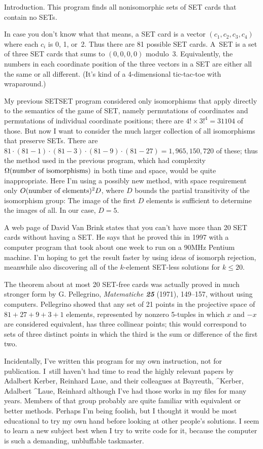 
\srcloctrue
\datethis
\def\SET/{{\mc SET\null}}


Introduction. This program finds all nonisomorphic sets
of \SET/ cards
that contain no \SET/s.

In case you don't know what that means, a \SET/ card is a vector
$(c_1,c_2,c_3,c_4)$ where each $c_i$ is 0, 1, or~2. Thus there are 81
possible \SET/ cards. A~\SET/ is a set of three \SET/ cards that sums
to $(0,0,0,0)$ modulo~3. Equivalently, the numbers in each coordinate
position of the three vectors in a \SET/ are either all the same or all
different. (It's kind of a 4-dimensional tic-tac-toe with wraparound.)

My previous {\sc SETSET} program considered only isomorphisms that
apply directly to the semantics of the game of \SET/, namely
permutations of coordinates and permutations of individual coordinate
positions; there are $4!\times 3!^4=31104$ of those. But now I want
to consider the much larger collection of all isomorphisms that
preserve \SET/s. There are $81\cdot(81-1)\cdot(81-3)\cdot(81-9)\cdot(81-27)
=1{,}965{,}150{,}720$ of these; thus the method used in the
previous program, which had complexity $\Omega(\hbox{number of isomorphisms})$
in both time and space, would be quite inappropriate. Here I'm using
a possibly new method, with space requirement only
$O(\hbox{number of elements})^2D$, where $D$ bounds the partial
transitivity of the isomorphism group: The image of the first $D$ elements
is sufficient to determine the images of all. In our case, $D=5$.

A web page of David Van Brink states that you can't have more than 20 \SET/
cards without having a \SET/. He says that he proved this in 1997 with a
computer program that took about one week to run on a 90MHz Pentium machine.
I'm hoping to get the result faster by using ideas of isomorph rejection,
meanwhile also discovering all of the $k$-element \SET/-less solutions
for $k\le20$.

The theorem about at most 20 \SET/-free cards was actually proved in much
stronger form by G. Pellegrino, {\sl Matematiche\/ \bf25} (1971), 149--157,
without using computers. Pellegrino showed that any set of 21 points in
the projective space of $81+27+9+3+1$ elements, represented by nonzero
5-tuples in which $x$ and $-x$ are considered equivalent, has three
collinear points; this would correspond to sets of three distinct points
in which the third is the sum or difference of the first two.

Incidentally, I've written this program for my own instruction, not for
publication. I~still haven't had time to read the highly relevant
papers by Adalbert Kerber, Reinhard Laue, and their colleagues at Bayreuth,
^{Kerber, Adalbert}
^{Laue, Reinhard}
although I've
had those works in my files for many years. Members of that group
probably are quite familiar with equivalent or better methods.
Perhaps I'm being foolish, but I thought it would be most educational to try
my own hand before looking at other people's solutions. I seem to learn a new
subject best when I try to write code for it, because the computer is
such a demanding, unbluffable taskmaster.

